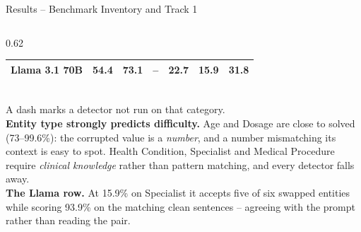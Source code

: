 \documentclass[aspectratio=169,11pt]{beamer}
\begin{document}
\begin{frame}[shrink=12]{Results \;--\; Benchmark Inventory and Track 1}
{\begin{columns}[T]
\begin{column}{0.62\textwidth}
\begin{tabular}{@{}lrrrrrr@{}}
Llama 3.1 70B & 54.4 & 73.1 & -- & 22.7 & 15.9 & 31.8\\
\bottomrule
\end{tabular}\\[1mm]
{\scriptsize A dash marks a detector not run on that category.}\\[2.5mm]
{\scriptsize
\textbf{Entity type strongly predicts difficulty.} Age and Dosage are close to solved (73--99.6\%): the corrupted value is a \emph{number}, and a number mismatching its context is easy to spot. Health Condition, Specialist and Medical Procedure require \emph{clinical knowledge} rather than pattern matching, and every detector falls away.\\[1.5mm]
\textbf{The Llama row.} At 15.9\% on Specialist it accepts five of six swapped entities while scoring 93.9\% on the matching clean sentences -- agreeing with the prompt rather than reading the pair.}
\end{column}
\end{columns}
}
\end{frame}
\end{document}
